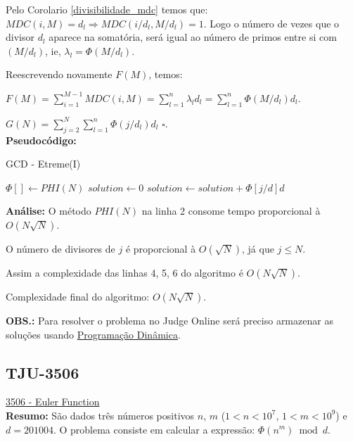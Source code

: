 Pelo Corolario \autoref{divisibilidade_mdc} temos que: $MDC(i,M) = d_l \Rightarrow MDC(i/d_l,M/d_l) = 1$. Logo o número de vezes que o divisor $d_l$ aparece na somatória, será igual ao número de primos entre si com $(M/d_l)$, ie, $\lambda_l = \Phi(M/d_l)$.

Reescrevendo novamente $F(M)$, temos:

$F(M) = \sum_{i=1}^{M-1}MDC(i, M) = \sum_{l=1}^n \lambda_l d_l = \sum_{l=1}^n \Phi(M/d_l) d_l$.

$G(N) = \sum_{j=2}^N \sum_{l=1}^n \Phi(j/d_l)d_l$ $\square$.
\\

\textbf{Pseudocódigo:}
\begin{algorithm}
\caption{GCD - Etreme(I)}\label{gcd_extreme}
\begin{algorithmic}[1]
\State $\Phi[] \gets PHI(N)$
\State $solution \gets 0$
\State $solution \gets solution + \Phi[j/d] d$
\EndFor
\EndFor
\State {}
\EndProcedure
\end{algorithmic}
\end{algorithm}


\textbf{Análise:}
O método $PHI(N)$ na linha 2 consome tempo proporcional à $O(N\sqrt{N})$.

O número de divisores de $j$ é proporcional à $O(\sqrt{N})$, já que $j \leq N$.

Assim a complexidade das linhas 4, 5, 6 do algoritmo é $O(N\sqrt{N})$.

Complexidade final do algoritmo: $O(N\sqrt{N})$.

\textbf{OBS.:} Para resolver o problema no Judge Online será preciso armazenar as soluções usando \href{https://linux.ime.usp.br/~stefanot/mac499/template.pdf}{Programação Dinâmica}.






\subsection{TJU-3506}
\href{http://acm.tju.edu.cn/toj/showp3506.html}{3506 - Euler Function} \\

\textbf{Resumo:}
São dados três números positivos $n$, $m$ ($1 < n < 10^7$, $1 < m < 10^9$) e $d = 201004$.
O problema consiste em calcular a expressão: $\Phi(n^m) \bmod d$.
\\

